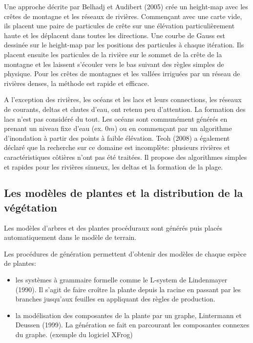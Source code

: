 \documentclass[11pt]{article}
\begin{document}
Une approche décrite par Belhadj et Audibert (2005) crée un height-map avec les crêtes de montagne et les réseaux de rivières. Commençant avec une carte vide, ils placent une paire de particules de crête sur une élévation particulièrement haute et les déplacent dans toutes les directions. Une courbe de Gauss est dessinée sur le height-map par les positions des particules à chaque itération. Ils placent ensuite les particules de la rivière sur le sommet de la crête de la montagne et les laissent s'écouler vers le bas suivant des règles simples de physique. Pour les crêtes de montagnes et les vallées irriguées par un réseau de rivières denses, la méthode est rapide et efficace. \newline
 
 A l'exception des rivières, les océans et les lacs et leurs connections, les réseaux de courants, deltas et chutes d'eau, ont retenu peu d'attention. La formation des lacs n'est pas considéré du tout. Les océans sont communément générés en prenant un niveau fixe d'eau (ex. $0m$) ou en commençant par un algorithme d'inondation à partir des points à faible élévation. Teoh (2008) a également déclaré que la recherche sur ce domaine est incomplète: plusieurs rivières et caractéristiques côtières n'ont pas été traitées. Il propose des algorithmes simples et rapides pour les rivières sinueux, les deltas et la formation de la plage.
 
\subsection*{Les modèles de plantes et la distribution de la végétation}

Les modèles d'arbres et des plantes procéduraux sont générés puis placés automatiquement dans le modèle de terrain. 

Les procédures de génération permettent d'obtenir des modèles de chaque espèce de plantes:
\begin{itemize}
\item les systèmes à grammaire formelle comme le L-system de Lindenmayer (1990). Il s'agit de faire croître la plante depuis la racine en passant par les branches jusqu'aux feuilles en appliquant des règles de production.
\item la modélisation des composantes de la plante par un graphe, Lintermann et Deussen (1999). La génération se fait en parcourant les composantes connexes du graphe. (exemple du logiciel XFrog)\newline
\end{itemize}
\end{document}
